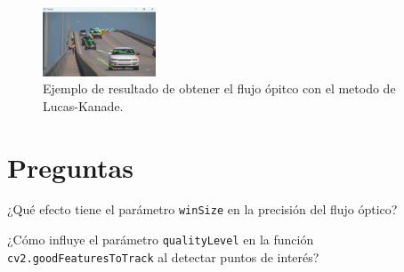\begin{figure}[H]
    \centering
    \includegraphics[width=0.3\textwidth]{Lab_4/template/figures/of_lk.png}
    \caption{Ejemplo de resultado de obtener el flujo ópitco con el metodo de Lucas-Kanade.}
    \label{fig:ejemplo_opticalflowLK}
\end{figure}

\section*{Preguntas}

\vspace{5mm}
\begin{tcolorbox}[colback=gray!10, colframe=gray!30, coltitle=black, title=Pregunta B.1, halign=left]
¿Qué efecto tiene el parámetro \texttt{winSize} en la precisión del flujo óptico?
\end{tcolorbox}


\vspace{5mm}
\begin{tcolorbox}[colback=gray!10, colframe=gray!30, coltitle=black, title=Pregunta B.2, halign=left]
¿Cómo influye el parámetro \texttt{qualityLevel} en la función \texttt{cv2.goodFeaturesToTrack} al detectar puntos de interés?
\end{tcolorbox}
